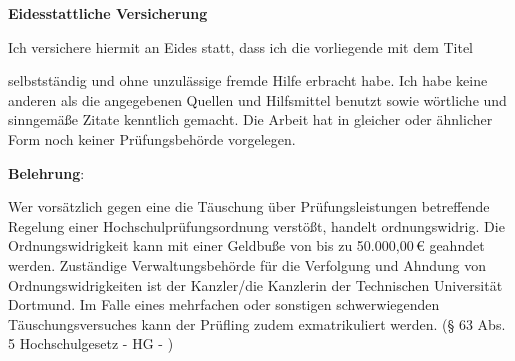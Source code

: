 \makeatletter
\cleardoublepage
\thispagestyle{empty}
\linespread{1.25}
\LARGE
\begin{center}
	\textbf{Eidesstattliche Versicherung}
\end{center}

\small
\vspace{\baselineskip}
\underline{\makebox[.4\textwidth][c]{\mySurname, \myForename}}
\hspace{.25\textwidth}
\underline{\makebox[.3\textwidth][c]{\myMatNr}}
\newline
{}
\hspace{.25\textwidth}
\vspace{\baselineskip}

\noindent Ich versichere hiermit an Eides statt, dass ich die vorliegende \myDocType\space mit dem Titel


\begin{center}
\textit{\myTitle}
\end{center}

\noindent selbstständig und ohne unzulässige fremde Hilfe erbracht habe. Ich habe keine anderen als die 
angegebenen Quellen und Hilfsmittel benutzt sowie wörtliche und sinngemäße Zitate kenntlich 
gemacht. Die Arbeit hat in gleicher oder ähnlicher Form noch keiner Prü\-fungs\-be\-hörde 
vorgelegen. 
\vspace{\baselineskip}

\underline{\makebox[.4\textwidth][c]{\myLocation, \myDate}} %
\hspace{.25\textwidth}
\underline{\hspace{.3\textwidth}}
\newline
{}
\hspace{.25\textwidth}

\vspace{\baselineskip}

\noindent \textbf{Belehrung}: 

\noindent Wer vorsätzlich gegen eine die Täuschung über Prüfungsleistungen betreffende Regelung einer 
Hochschulprüfungsordnung verstößt, handelt ordnungswidrig. Die Ordnungswidrigkeit kann mit 
einer Geldbuße von bis zu 50.000,00\,€ geahndet werden. Zuständige Verwaltungs\-behörde für 
die Verfolgung und Ahndung von Ordnungswidrigkeiten ist der Kanzler/die Kanzlerin der 
Technischen Universität Dortmund. Im Falle eines mehrfachen oder sonstigen schwerwiegenden 
Täuschungs\-versuches kann der Prüfling zudem exmatrikuliert werden. (§ 63 Abs. 5 
Hochschulgesetz - HG - )  

